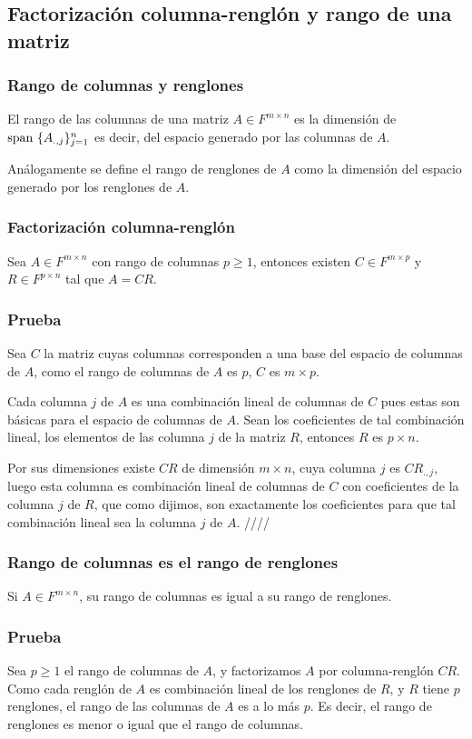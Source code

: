 \documentclass{article}
\begin{document}
\subsection{Factorización columna-renglón y rango de una matriz}
\subsubsection{Rango de columnas y renglones}
El rango de las columnas de una matriz $A\in F^{m\times n}$
es la dimensión de \\
$\text{span } \{A_{.,j}\}_{j=1}^n$ es decir, del
espacio generado por las columnas de $A$.

Análogamente se define el rango de renglones de $A$ como la 
dimensión del espacio generado por los renglones de $A$.

\subsubsection{Factorización columna-renglón}
Sea $A\in F^{m\times n}$ con rango de columnas $p\geq 1$,
entonces existen $C\in F^{m\times p}$ y $R\in F^{p\times n}$
tal que $A=CR$.
\subsubsection*{Prueba}
Sea $C$ la matriz cuyas columnas corresponden a una base del
espacio de columnas de $A$, como el rango de columnas de $A$ es $p$,
$C$ es $m\times p$.

Cada columna $j$ de $A$ es una combinación lineal
de columnas de $C$ pues estas son básicas para el espacio de columnas
de $A$. Sean los coeficientes de tal combinación lineal, los elementos
de las columna $j$ de la matriz $R$, entonces $R$ es $p\times n$.

Por sus dimensiones existe $CR$ de dimensión $m\times n$, cuya columna
$j$ es $CR_{.,j}$, luego esta columna es combinación lineal de columnas
de $C$ con coeficientes de la columna $j$ de $R$, que como dijimos, son
exactamente los coeficientes para que tal combinación lineal sea la columna $j$ de $A$. \hfill ////

\subsubsection{Rango de columnas es el rango de renglones}
Si $A\in F^{m\times n}$, su rango de columnas es igual a su rango
de renglones.
\subsubsection*{Prueba}
Sea $p\geq 1$ el rango de columnas de $A$, y factorizamos $A$
por columna-renglón $CR$. Como cada renglón de $A$ es
combinación lineal de los renglones de $R$, y $R$ tiene $p$
renglones, el rango de las columnas de $A$ es a lo más $p$.
Es decir, el rango de renglones es menor o igual que el rango de 
columnas.
\end{document}
